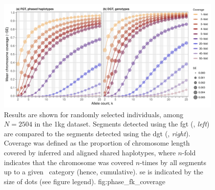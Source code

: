 

\begin{figure}[!htb]
\includegraphics[width=\textwidth]{./img/ch3/phase_coverage_1kg}
{Results are shown for  randomly selected individuals, among ${N=\num{2504}}$ in the \gls{1kg} dataset.
Segments detected using the \gls{fgt} (, \emph{left}) are compared to the segments detected using the \gls{dgt} (, \emph{right}).
Coverage was defined as the proportion of chromosome length covered by inferred and aligned shared haplotypes, where $n$-fold indicates that the chromosome was covered $n$-times by all segments up to a given \fk{}~category (hence, cumulative).
\Gls{se} is indicated by the size of dots (see figure legend).}
{fig:phase_fk_coverage}
\end{figure}
